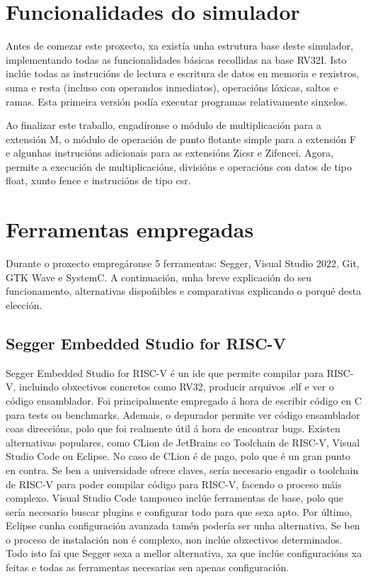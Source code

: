 \section{Funcionalidades do simulador}\label{sec:func_sim}
Antes de comezar este proxecto, xa existía unha estrutura base deste simulador, implementando todas as funcionalidades básicas recollidas na base RV32I. Isto inclúe todas as instrucións de lectura e escritura de datos en memoria e rexistros, suma e resta (incluso con operandos inmediatos), operacións lóxicas, saltos e ramas. Esta primeira versión podía executar programas relativamente sinxelos.

Ao finalizar este traballo, engadíronse o módulo de multiplicación para a extensión M, o módulo de operación de punto flotante simple para a extensión F e algunhas instrucións adicionais para as extensións Zicsr e Zifencei. Agora, permite a execución de multiplicacións, divisións e operacións con datos de tipo float, xunto fence e instrucións de tipo \acrshort{csr}.

\section{Ferramentas empregadas}\label{sec:ferramentas}
Durante o proxecto empregáronse 5 ferramentas: Segger, Visual Studio 2022, Git, GTK Wave e SystemC. A continuación, unha breve explicación do seu funcionamento, alternativas dispoñibles e comparativas explicando o porqué desta elección.

\subsection{Segger Embedded Studio for RISC-V}\label{sec:segger}
Segger Embedded Studio for RISC-V é un \acrfull{ide} que permite compilar para RISC-V, incluindo obxectivos concretos como RV32, producir arquivos .elf e ver o código ensamblador. Foi principalmente empregado á hora de escribir código en C para \gls{tests} ou \gls{benchmarks}. Ademais, o depurador permite ver código ensamblador coas direccións, polo que foi realmente útil á hora de encontrar bugs. Existen alternativas populares, como CLion de JetBrains co Toolchain de RISC-V, Visual Studio Code ou Eclipse. No caso de CLion é de pago, polo que é un gran punto en contra. Se ben a universidade ofrece claves, sería necesario engadir o toolchain de RISC-V para poder compilar código para RISC-V, facendo o proceso máis complexo. Visual Studio Code tampouco inclúe ferramentas de base, polo que sería necesario buscar plugins e configurar todo para que sexa apto. Por último, Eclipse cunha configuración avanzada tamén podería ser unha alternativa. Se ben o proceso de instalación non é complexo, non inclúe obxectivos determinados. Todo isto fai que Segger sexa a mellor alternativa, xa que inclúe configuracións xa feitas e todas as ferramentas necesarias sen apenas configuración.

